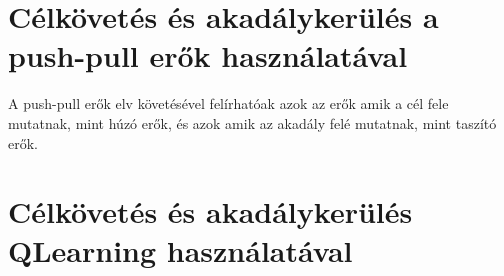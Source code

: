 \section{Célkövetés és akadálykerülés a push-pull erők használatával}

A push-pull erők elv követésével felírhatóak azok az erők amik a cél fele mutatnak, mint húzó erők, és azok amik az akadály felé mutatnak, mint taszító erők.


\section{Célkövetés és akadálykerülés QLearning használatával}



\subsection{}